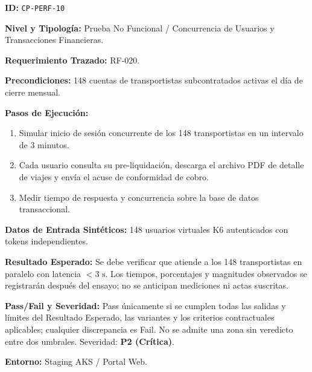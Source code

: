 \par\noindent\textbf{ID:} \texttt{C\allowbreak{}P\allowbreak{}-\allowbreak{}P\allowbreak{}E\allowbreak{}R\allowbreak{}F\allowbreak{}-\allowbreak{}1\allowbreak{}0\allowbreak{}}\par
\par\noindent\textbf{Nivel y Tipología:} Prueba No Funcional / Concurrencia de Usuarios y Transacciones Financieras.\par
\par\noindent\textbf{Requerimiento Trazado:} RF-020.\par
\par\noindent\textbf{Precondiciones:} 148 cuentas de transportistas subcontratados activas el día de cierre mensual.\par
\par\noindent\textbf{Pasos de Ejecución:} \par
\begin{enumerate}
\item Simular inicio de sesión concurrente de los 148 transportistas en un intervalo de 3 minutos.
\item Cada usuario consulta su pre-liquidación, descarga el archivo PDF de detalle de viajes y envía el acuse de conformidad de cobro.
\item Medir tiempo de respuesta y concurrencia sobre la base de datos transaccional.
\end{enumerate}
\par\noindent\textbf{Datos de Entrada Sintéticos:} 148 usuarios virtuales K6 autenticados con tokens independientes.\par
\par\noindent\textbf{Resultado Esperado:} Se debe verificar que atiende a los 148 transportistas en paralelo con latencia \(< 3\text{ s}\). Los tiempos, porcentajes y magnitudes observados se registrarán después del ensayo; no se anticipan mediciones ni actas suscritas.\par
\par\noindent\textbf{Pass/Fail y Severidad:} Pass únicamente si se cumplen todas las salidas y límites del Resultado Esperado, las variantes y los criterios contractuales aplicables; cualquier discrepancia es Fail. No se admite una zona sin veredicto entre dos umbrales. Severidad: \textbf{P2 (Crítica)}.\par
\par\noindent\textbf{Entorno:} Staging AKS / Portal Web.\par







